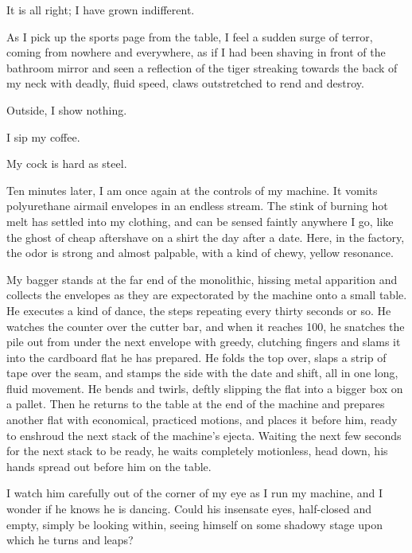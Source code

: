 It is all right; I have grown indifferent.



As I pick up the sports page from the table, I feel a sudden surge
of terror, coming from nowhere and everywhere, as if I had been
shaving in front of the bathroom mirror and seen a reflection of
the tiger streaking towards the back of my neck with deadly, fluid
speed, claws outstretched to rend and destroy.



Outside, I show nothing.



I sip my coffee.



My cock is hard as steel.



Ten minutes later, I am once again at the controls of my machine.
It vomits polyurethane airmail envelopes in an endless stream. The
stink of burning hot melt has settled into my clothing, and can be
sensed faintly anywhere I go, like the ghost of cheap aftershave on
a shirt the day after a date. Here, in the factory, the odor is
strong and almost palpable, with a kind of chewy, yellow
resonance.



My bagger stands at the far end of the monolithic, hissing metal
apparition and collects the envelopes as they are expectorated by
the machine onto a small table. He executes a kind of dance, the
steps repeating every thirty seconds or so. He watches the counter
over the cutter bar, and when it reaches 100, he snatches the pile
out from under the next envelope with greedy, clutching fingers and
slams it into the cardboard flat he has prepared. He folds the top
over, slaps a strip of tape over the seam, and stamps the side with
the date and shift, all in one long, fluid movement. He bends and
twirls, deftly slipping the flat into a bigger box on a pallet.
Then he returns to the table at the end of the machine and prepares
another flat with economical, practiced motions, and places it
before him, ready to enshroud the next stack of the machine's
ejecta. Waiting the next few seconds for the next stack to be
ready, he waits completely motionless, head down, his hands spread
out before him on the table.



I watch him carefully out of the corner of my eye as I run my
machine, and I wonder if he knows he is dancing. Could his
insensate eyes, half-closed and empty, simply be looking within,
seeing himself on some shadowy stage upon which he turns and
leaps?



